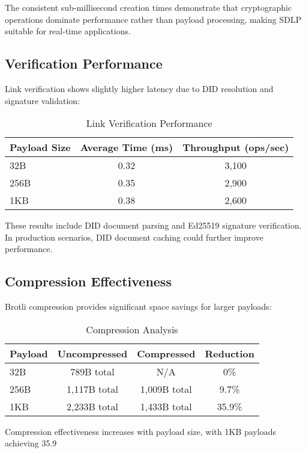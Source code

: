 \documentclass[conference]{IEEEtran}
\begin{document}
The consistent sub-millisecond creation times demonstrate that cryptographic operations dominate performance rather than payload processing, making SDLP suitable for real-time applications.

\subsection{Verification Performance}

Link verification shows slightly higher latency due to DID resolution and signature validation:

\begin{table}[!t]
\caption{Link Verification Performance}
\label{tab:verification-performance}
\centering
\begin{tabular}{@{}lcc@{}}
\toprule
Payload Size & Average Time (ms) & Throughput (ops/sec) \\
\midrule
32B & 0.32 & 3,100 \\
256B & 0.35 & 2,900 \\
1KB & 0.38 & 2,600 \\
\bottomrule
\end{tabular}
\end{table}

These results include DID document parsing and Ed25519 signature verification. In production scenarios, DID document caching could further improve performance.

\subsection{Compression Effectiveness}

Brotli compression provides significant space savings for larger payloads:

\begin{table}[!t]
\caption{Compression Analysis}
\label{tab:compression}
\centering
\begin{tabular}{@{}lccc@{}}
\toprule
Payload & Uncompressed & Compressed & Reduction \\
\midrule
32B & 789B total & N/A & 0\% \\
256B & 1,117B total & 1,009B total & 9.7\% \\
1KB & 2,233B total & 1,433B total & 35.9\% \\
\bottomrule
\end{tabular}
\end{table}

Compression effectiveness increases with payload size, with 1KB payloads achieving 35.9%
\end{document}
